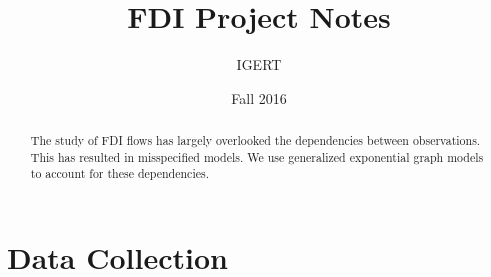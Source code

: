 \documentclass{article}
\begin{document}
\title{FDI Project Notes}
\author{IGERT}
\date{Fall 2016}
\maketitle

\singlespacing
\begin{abstract} 
    \noindent The study of FDI flows has largely overlooked the dependencies between observations. This has resulted in misspecified models. We use generalized exponential graph models to account for these dependencies.

\end{abstract}

\doublespacing

\section{Data Collection}
\end{document}
